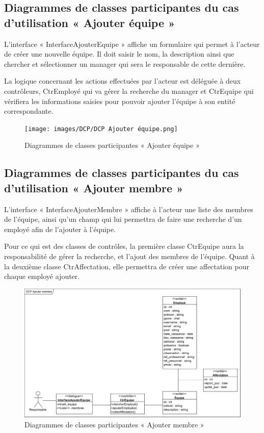 \subsection*{Diagrammes de classes participantes du cas d'utilisation « Ajouter équipe »}
L’interface « InterfaceAjouterEquipe » affiche un formulaire qui permet à
l’acteur de créer une nouvelle équipe. Il doit saisir le nom, la description
ainsi que chercher et sélectionner un manager qui sera le responsable de cette
dernière.
        
La logique concernant les actions effectuées par l’acteur est déléguée à 
deux contrôleurs, CtrEmployé qui va gérer la recherche du manager et CtrEquipe
qui vérifiera les informations saisies pour pouvoir ajouter l’équipe à son 
entité correspondante.
       
\clearpage
            
\begin{figure}[h!]
    \centering
    \texttt{[image: images/DCP/DCP Ajouter équipe.png]}
    \caption{Diagrammes de classes participantes « Ajouter équipe »}
    \label{fig29}
\end{figure}
            
\subsection*{Diagrammes de classes participantes du cas d'utilisation « Ajouter membre »}
L’interface « InterfaceAjouterMembre » affiche à l’acteur une liste des membres 
de l’équipe, ainsi qu’un champ qui lui permettra de faire une recherche d’un 
employé afin de l’ajouter à l’équipe.
        
Pour ce qui est des classes de contrôles, la première classe CtrEquipe aura la 
responsabilité de gérer la recherche, et l’ajout des membres de l’équipe. Quant
à la deuxième classe CtrAffectation, elle permettra de créer une affectation pour 
chaque employé ajouter.
       
\clearpage
            
\begin{figure}[h!]
	\centering
    \includegraphics[scale=0.72]{images/DCP/DCP Ajouter membre.png}
    \caption{Diagrammes de classes participantes « Ajouter membre »}
    \label{fig30}
\end{figure}
            

